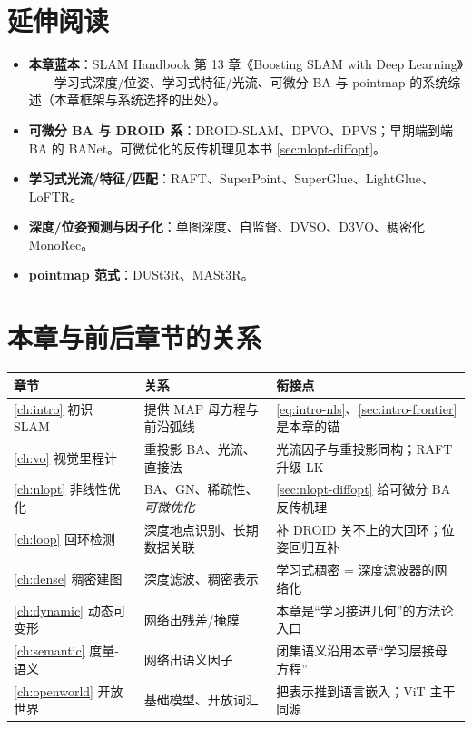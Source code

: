 \section*{延伸阅读}
\begin{itemize}
  \item \textbf{本章蓝本}：SLAM Handbook\cite{teed2026boosting} 第 13 章《Boosting SLAM with Deep Learning》——学习式深度/位姿、学习式特征/光流、可微分 BA 与 pointmap 的系统综述（本章框架与系统选择的出处）。
  \item \textbf{可微分 BA 与 DROID 系}：DROID-SLAM\cite{teed2021droid}、DPVO\cite{teed2023dpvo}、DPVS\cite{lipson2024dpvs}；早期端到端 BA 的 BANet\cite{tang2019banet}。可微优化的反传机理见本书 \cref{sec:nlopt-diffopt}。
  \item \textbf{学习式光流/特征/匹配}：RAFT\cite{teed2020raft}、SuperPoint\cite{detone2018superpoint}、SuperGlue\cite{sarlin2020superglue}、LightGlue\cite{lindenberger2023lightglue}、LoFTR\cite{sun2021loftr}。
  \item \textbf{深度/位姿预测与因子化}：单图深度\cite{eigen2014depth,ranftl2021dpt}、自监督\cite{godard2017unsupervised,zhou2017unsupervised}、DVSO\cite{yang2018dvso}、D3VO\cite{yang2020d3vo}、稠密化 MonoRec\cite{wimbauer2021monorec}。
  \item \textbf{pointmap 范式}：DUSt3R\cite{wang2024dust3r}、MASt3R\cite{leroy2024mast3r}。
\end{itemize}

\section*{本章与前后章节的关系}
\begin{table}[H]\centering\small
\begin{tabular}{lll}
\toprule
章节 & 关系 & 衔接点 \\
\midrule
\cref{ch:intro} 初识 SLAM & 提供 MAP 母方程与前沿弧线 & \cref{eq:intro-nls}、\cref{sec:intro-frontier} 是本章的锚 \\
\cref{ch:vo} 视觉里程计 & 重投影 BA、光流、直接法 & 光流因子与重投影同构；RAFT 升级 LK \\
\cref{ch:nlopt} 非线性优化 & BA、GN、稀疏性、\emph{可微优化} & \cref{sec:nlopt-diffopt} 给可微分 BA 反传机理 \\
\cref{ch:loop} 回环检测 & 深度地点识别、长期数据关联 & 补 DROID 关不上的大回环；位姿回归互补 \\
\cref{ch:dense} 稠密建图 & 深度滤波、稠密表示 & 学习式稠密 = 深度滤波器的网络化 \\
\cref{ch:dynamic} 动态可变形 & 网络出残差/掩膜 & 本章是“学习接进几何”的方法论入口 \\
\cref{ch:semantic} 度量-语义 & 网络出语义因子 & 闭集语义沿用本章“学习层接母方程” \\
\cref{ch:openworld} 开放世界 & 基础模型、开放词汇 & 把表示推到语言嵌入；ViT 主干同源 \\
\bottomrule
\end{tabular}
\end{table}

